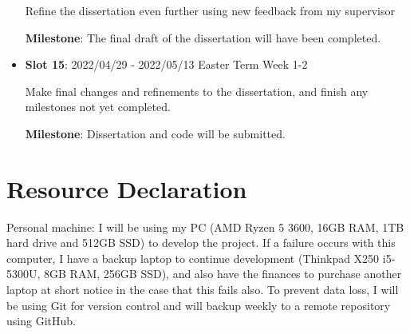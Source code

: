 \documentclass[12pt]{article}
\begin{document}
\begin{itemize}
Refine the dissertation even further using new feedback from my supervisor

\textbf{Milestone}: The final draft of the dissertation will have been completed.

\item
  \textbf{Slot 15}: 2022/04/29 - 2022/05/13 \hspace*{\fill}Easter Term Week 1-2

Make final changes and refinements to the dissertation, and finish any milestones not yet completed.

\textbf{Milestone}: Dissertation and code will be submitted.
\end{itemize}

\section{Resource Declaration}

Personal machine: I will be using my PC (AMD Ryzen 5 3600, 16GB RAM, 1TB hard drive and 512GB SSD) to develop the project. If a failure occurs with this computer, I have a backup laptop to continue development (Thinkpad X250 i5-5300U, 8GB RAM, 256GB SSD), and also have the finances to purchase another laptop at short notice in the case that this fails also. To prevent data loss, I will be using Git for version control and will backup weekly to a remote repository using GitHub.

\printbibliography
\end{document}
